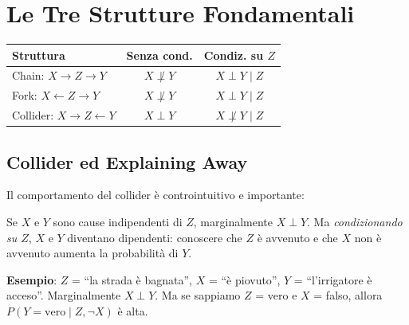 \section{Le Tre Strutture Fondamentali}

\begin{center}
\begin{tabular}{|l|c|c|}
\hline
\textbf{Struttura} & \textbf{Senza cond.} & \textbf{Condiz. su $Z$} \\
\hline
Chain: $X \to Z \to Y$ & $X \not\perp Y$ & $X \perp Y \mid Z$ \\
Fork: $X \leftarrow Z \to Y$ & $X \not\perp Y$ & $X \perp Y \mid Z$ \\
Collider: $X \to Z \leftarrow Y$ & $X \perp Y$ & $X \not\perp Y \mid Z$ \\
\hline
\end{tabular}
\end{center}

\subsection{Collider ed Explaining Away}

Il comportamento del collider è controintuitivo e importante:

\begin{tcolorbox}[title=Explaining Away]
Se $X$ e $Y$ sono cause indipendenti di $Z$, marginalmente $X \perp Y$. Ma \textit{condizionando su $Z$}, $X$ e $Y$ diventano dipendenti: conoscere che $Z$ è avvenuto e che $X$ non è avvenuto aumenta la probabilità di $Y$.

\textbf{Esempio}: $Z$ = ``la strada è bagnata'', $X$ = ``è piovuto'', $Y$ = ``l'irrigatore è acceso''. Marginalmente $X \perp Y$. Ma se sappiamo $Z$ = vero e $X$ = falso, allora $P(Y=\text{vero} \mid Z, \neg X)$ è alta.
\end{tcolorbox}


